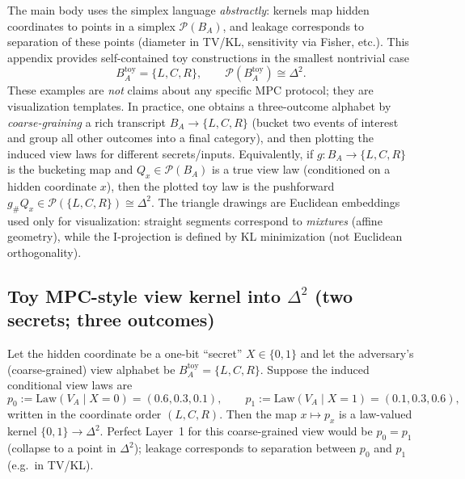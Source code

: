 \documentclass[11pt,a4paper]{article}
\theoremstyle{definition}
\theoremstyle{plain}
\newcommand{\Prob}{\mathcal{P}}
\begin{document}
The main body uses the simplex language \emph{abstractly}: kernels map hidden coordinates to points in a simplex $\Prob(B_A)$, and leakage corresponds to separation of these points (diameter in TV/KL, sensitivity via Fisher, etc.).
This appendix provides self-contained toy constructions in the smallest nontrivial case
\[
B_A^{\mathrm{toy}}=\{L,C,R\},\qquad \Prob(B_A^{\mathrm{toy}})\cong \Delta^2.
\]
These examples are \emph{not} claims about any specific MPC protocol; they are visualization templates.
In practice, one obtains a three-outcome alphabet by \emph{coarse-graining} a rich transcript $B_A\to \{L,C,R\}$ (bucket two events of interest and group all other outcomes into a final category), and then plotting the induced view laws for different secrets/inputs.
Equivalently, if $g:B_A\to\{L,C,R\}$ is the bucketing map and $Q_x\in\Prob(B_A)$ is a true view law (conditioned on a hidden coordinate $x$), then the plotted toy law is the pushforward $g_\# Q_x\in\Prob(\{L,C,R\})\cong \Delta^2$.
The triangle drawings are Euclidean embeddings used only for visualization: straight segments correspond to \emph{mixtures} (affine geometry), while the I-projection is defined by KL minimization (not Euclidean orthogonality).

\subsection{Toy MPC-style view kernel into \texorpdfstring{$\Delta^2$}{Delta2} (two secrets; three outcomes)}
\label{subsec:toy-kernel-delta2}

Let the hidden coordinate be a one-bit ``secret'' $X\in\{0,1\}$ and let the adversary's (coarse-grained) view alphabet be $B_A^{\mathrm{toy}}=\{L,C,R\}$.
Suppose the induced conditional view laws are
\[
p_0:=\mathrm{Law}(V_A\mid X=0)=(0.6,0.3,0.1),\qquad
p_1:=\mathrm{Law}(V_A\mid X=1)=(0.1,0.3,0.6),
\]
written in the coordinate order $(L,C,R)$.
Then the map $x\mapsto p_x$ is a law-valued kernel $\{0,1\}\to\Delta^2$.
Perfect Layer~1 for this coarse-grained view would be $p_0=p_1$ (collapse to a point in $\Delta^2$); leakage corresponds to separation between $p_0$ and $p_1$ (e.g.\ in TV/KL).
\end{document}
